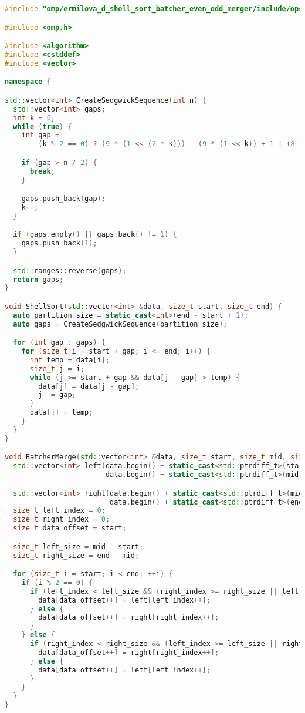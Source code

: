 \documentclass[a4paper,12pt]{article}
\begin{document}
\begin{lstlisting}[language=C++]
#include "omp/ermilova_d_shell_sort_batcher_even_odd_merger/include/ops_omp.hpp"

#include <omp.h>

#include <algorithm>
#include <cstddef>
#include <vector>

namespace {

std::vector<int> CreateSedgwickSequence(int n) {
  std::vector<int> gaps;
  int k = 0;
  while (true) {
    int gap =
        (k % 2 == 0) ? (9 * (1 << (2 * k))) - (9 * (1 << k)) + 1 : (8 * (1 << k)) - (6 * (1 << ((k + 1) / 2))) + 1;

    if (gap > n / 2) {
      break;
    }

    gaps.push_back(gap);
    k++;
  }

  if (gaps.empty() || gaps.back() != 1) {
    gaps.push_back(1);
  }

  std::ranges::reverse(gaps);
  return gaps;
}

void ShellSort(std::vector<int> &data, size_t start, size_t end) {
  auto partition_size = static_cast<int>(end - start + 1);
  auto gaps = CreateSedgwickSequence(partition_size);

  for (int gap : gaps) {
    for (size_t i = start + gap; i <= end; i++) {
      int temp = data[i];
      size_t j = i;
      while (j >= start + gap && data[j - gap] > temp) {
        data[j] = data[j - gap];
        j -= gap;
      }
      data[j] = temp;
    }
  }
}

void BatcherMerge(std::vector<int> &data, size_t start, size_t mid, size_t end) {
  std::vector<int> left(data.begin() + static_cast<std::ptrdiff_t>(start),
                        data.begin() + static_cast<std::ptrdiff_t>(mid));

  std::vector<int> right(data.begin() + static_cast<std::ptrdiff_t>(mid),
                         data.begin() + static_cast<std::ptrdiff_t>(end));
  size_t left_index = 0;
  size_t right_index = 0;
  size_t data_offset = start;

  size_t left_size = mid - start;
  size_t right_size = end - mid;

  for (size_t i = start; i < end; ++i) {
    if (i % 2 == 0) {
      if (left_index < left_size && (right_index >= right_size || left[left_index] <= right[right_index])) {
        data[data_offset++] = left[left_index++];
      } else {
        data[data_offset++] = right[right_index++];
      }
    } else {
      if (right_index < right_size && (left_index >= left_size || right[right_index] <= left[left_index])) {
        data[data_offset++] = right[right_index++];
      } else {
        data[data_offset++] = left[left_index++];
      }
    }
  }
}


\end{lstlisting}
\end{document}
